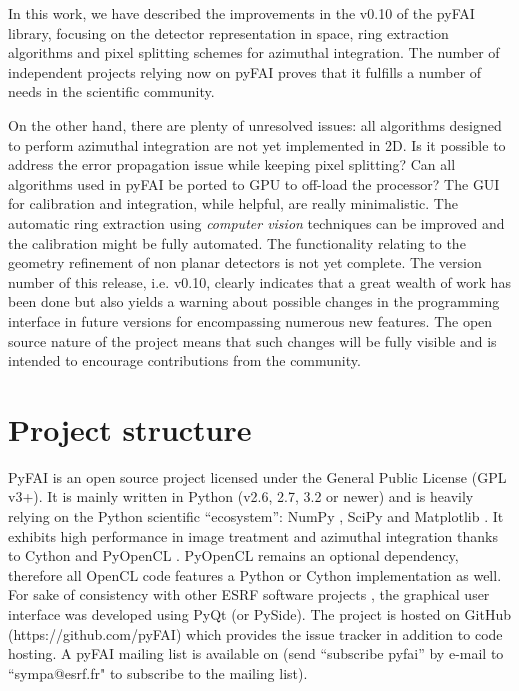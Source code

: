 \documentclass{iucr}
\begin{document}
In this work, we have described the improvements in the
v0.10 of the pyFAI library, focusing on the detector representation in space, ring
extraction algorithms and pixel splitting schemes for azimuthal integration.
The number of independent projects relying now on pyFAI proves that it fulfills a
number of needs in the scientific community.

On the other hand, there are plenty of unresolved issues: all
algorithms designed to perform azimuthal integration are not yet implemented in
2D. Is it possible to address the error propagation issue while keeping pixel
splitting? Can all algorithms used in pyFAI be ported to GPU to off-load the
processor? The GUI for calibration and integration, while helpful, are really
minimalistic.
The automatic ring extraction using \textit{computer vision} techniques can
be improved and the calibration might be fully automated.
The functionality relating to the geometry refinement of non planar
detectors is not yet complete.
The version number of this release, i.e. v0.10, clearly indicates that a great
wealth of work has been done but also yields a warning about possible changes
in the programming interface in future versions for encompassing numerous new
features.
The open source nature of the project means that such changes will be 
fully visible and is intended to encourage contributions from the community.




\appendix
\section{Project structure}

PyFAI is an open source project licensed under the General Public License (GPL
v3+).
It is mainly written in Python (v2.6, 2.7, 3.2 or newer) and is
heavily relying on the Python scientific ``ecosystem'': NumPy \cite{numpy}, SciPy \cite{scipy} and Matplotlib \cite{matplotlib}.
It exhibits high performance in image treatment and azimuthal integration
thanks to Cython \cite{cython} and PyOpenCL \cite{pyopencl}.
PyOpenCL remains an optional dependency, therefore all OpenCL code features a
Python or Cython implementation as well.
For sake of consistency with other ESRF software projects \cite{pymca}, the
graphical user interface was developed using PyQt (or PySide).
The project is hosted on GitHub (https://github.com/pyFAI) which provides
the issue tracker in addition to code hosting.
A pyFAI mailing list is
available on  (send ``subscribe pyfai'' by e-mail to
``sympa@esrf.fr" to subscribe to the mailing list).
\end{document}

